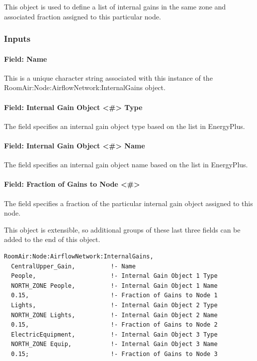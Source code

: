 This object is used to define a list of internal gains in the same zone and associated fraction assigned to this particular node.

\subsubsection{Inputs}\label{inputs-14-012}

\paragraph{Field: Name}\label{field-name-10-014}

This is a unique character string associated with this instance of the Room\-Air:\-Node:\-Air\-flow\-Net\-work:\-Internal\-Gains object.

\paragraph{Field: Internal Gain Object \textless{}\#\textgreater{} Type}\label{field-internal-gain-object-x-type}

The field specifies an internal gain object type based on the list in EnergyPlus.

\paragraph{Field: Internal Gain Object \textless{}\#\textgreater{} Name}\label{field-internal-gain-object-x-name}

The field specifies an internal gain object name based on the list in EnergyPlus.

\paragraph{Field: Fraction of Gains to Node \textless{}\#\textgreater{}}\label{field-fraction-of-gains-to-node-x}

The field specifies a fraction of the particular internal gain object assigned to this node.

This object is extensible, so additional groups of these last three fields can be added to the end of this object.

\begin{lstlisting}
RoomAir:Node:AirflowNetwork:InternalGains,
  CentralUpper_Gain,          !- Name
  People,                     !- Internal Gain Object 1 Type
  NORTH_ZONE People,          !- Internal Gain Object 1 Name
  0.15,                       !- Fraction of Gains to Node 1
  Lights,                     !- Internal Gain Object 2 Type
  NORTH_ZONE Lights,          !- Internal Gain Object 2 Name
  0.15,                       !- Fraction of Gains to Node 2
  ElectricEquipment,          !- Internal Gain Object 3 Type
  NORTH_ZONE Equip,           !- Internal Gain Object 3 Name
  0.15;                       !- Fraction of Gains to Node 3
\end{lstlisting}

